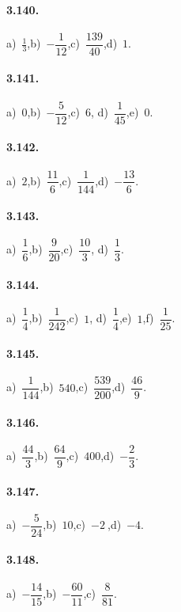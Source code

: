 \begin{multicols}{2}
\paragraph{3.140.}
a)~$\frac{1}{3}$,\quad b)~$-\dfrac{1}{12}$,\quad c)~$\dfrac{139}{40}$,\quad d)~$1$.

\paragraph{3.141.}
a)~$0$,\quad b)~$-\dfrac{5}{12}$,\quad c)~$6$,\quad %
d)~$\dfrac{1}{45}$,\quad e)~$0$.

\paragraph{3.142.}
a)~$2$,\quad b)~$\dfrac{11}{6}$,\quad c)~$\dfrac{1}{144}$,\quad d)~$-\dfrac{13}{6}$.

\paragraph{3.143.}
a)~$\dfrac{1}{6}$,\quad b)~$\dfrac{9}{20}$,\quad c)~$\dfrac{10}{3}$,\quad %
d)~$\dfrac{1}{3}$.

\paragraph{3.144.}
a)~$\dfrac{1}{4}$,\quad b)~$\dfrac{1}{242}$,\quad c)~$1$,\quad %
d)~$\dfrac{1}{4}$,\quad e)~$1$,\quad f)~$\dfrac{1}{25}$.

\paragraph{3.145.}
a)~$\dfrac{1}{144}$,\quad b)~$540$,\quad c)~$\dfrac{539}{200}$,\quad d)~$\dfrac{46}{9}$.

\paragraph{3.146.}
a)~$\dfrac{44}{3}$,\quad b)~$\dfrac{64}{9}$,\quad c)~$400$,\quad d)~$-\dfrac{2}{3}$.

\paragraph{3.147.}
a)~$-\dfrac{5}{24}$,\quad b)~$10$,\quad c)~$-2~$,\quad d)~$-4$.

\paragraph{3.148.}
a)~$-\dfrac{14}{15}$,\quad b)~$-\dfrac{60}{11}$,\quad c)~$\dfrac{8}{81}$.%


\end{multicols}
